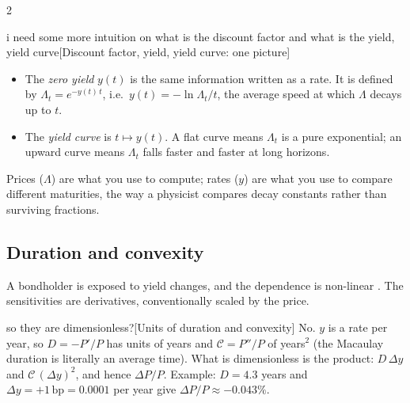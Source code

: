 \begin{paracol}{2}
\begin{answer}{i need some more intuition on what is the discount factor and what is the yield, yield curve}[Discount factor, yield, yield curve: one picture]
\begin{itemize}
        It starts at $\Lambda_0=1$ and decreases, because waiting costs money.
  \item The \emph{zero yield} $y(t)$ is the same information written as a rate. It is defined by
        $\Lambda_t=e^{-y(t)\,t}$, i.e.\ $y(t)=-\ln\Lambda_t/t$, the average speed at which $\Lambda$ decays up to $t$.
  \item The \emph{yield curve} is $t\mapsto y(t)$. A flat curve means $\Lambda_t$ is a pure exponential;
        an upward curve means $\Lambda_t$ falls faster and faster at long horizons.
\end{itemize}
Prices ($\Lambda$) are what you use to compute; rates ($y$) are what you use to compare different maturities,
the way a physicist compares decay constants rather than surviving fractions.
\begin{center}
\end{center}
\end{answer}

\subsection{Duration and convexity}\label{sec:duration}
A bondholder is exposed to yield changes, and the dependence is non-linear .
The sensitivities are derivatives, conventionally scaled by the price. \begin{answer}{so they are dimensionless?}[Units of duration and convexity]
No. $y$ is a rate per year, so $D=-P'/P$ has units of years and $\mathcal C=P''/P$ of years$^2$
(the Macaulay duration is literally an average time). What is dimensionless is the product:
$D\,\Delta y$ and $\mathcal C\,(\Delta y)^2$, and hence $\Delta P/P$. Example: $D=4.3$ years and
$\Delta y=+1\,\text{bp}=0.0001$ per year give $\Delta P/P\approx-0.043\%$.
\end{answer}


\end{paracol}
